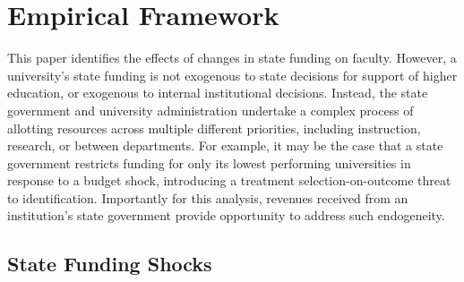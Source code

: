 \section{Empirical Framework}
\label{sec:empirics}

This paper identifies the effects of changes in state funding on faculty.
However, a university's state funding is not exogenous to state decisions for support of higher education, or exogenous to internal institutional decisions.
Instead, the state government and university administration undertake a complex process of allotting resources across multiple different priorities, including instruction, research, or between departments.
For example, it may be the case that a state government restricts funding for only its lowest performing universities in response to a budget shock, introducing a treatment selection-on-outcome threat to identification. 
Importantly for this analysis, revenues received from an institution's state government provide opportunity to address such endogeneity.


\subsection{State Funding Shocks}
\label{sec:approp-shocks}

